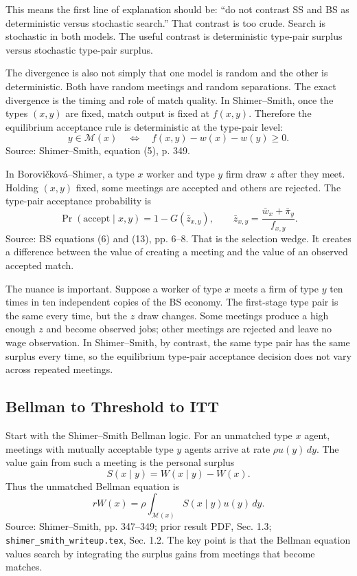 ﻿\documentclass[11pt]{article}
\newcommand{\1}{\mathbf{1}}
\begin{document}
This means the first line of explanation should be: ``do not contrast SS and BS as
deterministic versus stochastic search.'' That contrast is too crude. Search is stochastic
in both models. The useful contrast is deterministic type-pair surplus versus stochastic
type-pair surplus.

The divergence is also not simply that one model is random and the other is
deterministic. Both have random meetings and random separations. The exact
divergence is the timing and role of match quality. In Shimer--Smith, once the
types $(x,y)$ are fixed, match output is fixed at $f(x,y)$. Therefore the
equilibrium acceptance rule is deterministic at the type-pair level:
\[
y\in \mathcal M(x)
\quad\Longleftrightarrow\quad
f(x,y)-w(x)-w(y)\geq 0 .
\]
Source: Shimer--Smith, equation (5), p. 349.

In Borovi\v{c}kov\'a--Shimer, a type $x$ worker and type $y$ firm draw $z$ after
they meet. Holding $(x,y)$ fixed, some meetings are accepted and others are
rejected. The type-pair acceptance probability is
\[
\Pr(\text{accept}\mid x,y)=1-G(\bar z_{x,y}),
\qquad
\bar z_{x,y}=\frac{\bar w_x+\bar\pi_y}{f_{x,y}}.
\]
Source: BS equations (6) and (13), pp. 6--8. That is the selection wedge. It
creates a difference between the value of creating a meeting and the value of an
observed accepted match.

The nuance is important. Suppose a worker of type $x$ meets a firm of type $y$ ten
times in ten independent copies of the BS economy. The first-stage type pair is the
same every time, but the $z$ draw changes. Some meetings produce a high enough $z$
and become observed jobs; other meetings are rejected and leave no wage observation.
In Shimer--Smith, by contrast, the same type pair has the same surplus every time,
so the equilibrium type-pair acceptance decision does not vary across repeated meetings.

\subsection{Bellman to Threshold to ITT}

Start with the Shimer--Smith Bellman logic. For an unmatched type $x$ agent,
meetings with mutually acceptable type $y$ agents arrive at rate $\rho u(y)\,dy$.
The value gain from such a meeting is the personal surplus
\[
S(x\mid y)=W(x\mid y)-W(x).
\]
Thus the unmatched Bellman equation is
\[
rW(x)
=
\rho\int_{\mathcal M(x)}S(x\mid y)u(y)\,dy.
\tag{SS-unmatched}
\]
Source: Shimer--Smith, pp. 347--349; prior result PDF, Sec. 1.3;
\texttt{shimer\_smith\_writeup.tex}, Sec. 1.2. The key point is that the
Bellman equation values search by integrating the surplus gains from meetings
that become matches.
\end{document}
